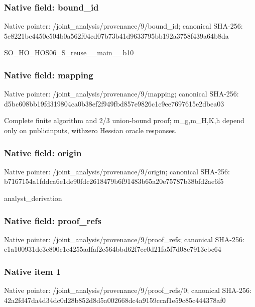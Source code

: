 \documentclass[10pt,a4paper]{article}
\begin{document}
\subsubsection{Native field: bound\_\allowbreak{}id}
Native pointer: /joint\_\allowbreak{}analysis/provenance/9/bound\_\allowbreak{}id; canonical SHA-256: 5e8221be4450e504b0a562f04cd07b73b41d9633795bb192a3758f439a64b8da

\begingroup\raggedright\sloppy SO\_\allowbreak{}HO\_\allowbreak{}HOS06\_\allowbreak{}S\_\allowbreak{}reuse\_\allowbreak{}\_\allowbreak{}main\_\allowbreak{}\_\allowbreak{}b10\par\endgroup

\subsubsection{Native field: mapping}
Native pointer: /joint\_\allowbreak{}analysis/provenance/9/mapping; canonical SHA-256: d5bc608bb19fd319804ca0b38ef2f949fbd857e9826c1c9ee7697615e2dbea03

\begingroup\raggedright\sloppy Complete finite algorithm and 2/\allowbreak{}3 union-bound proof;\allowbreak{} m\_\allowbreak{}g,\allowbreak{}m\_\allowbreak{}H,\allowbreak{}K,\allowbreak{}h depend only on publicinputs,\allowbreak{} withzero Hessian oracle responses.\par\endgroup

\subsubsection{Native field: origin}
Native pointer: /joint\_\allowbreak{}analysis/provenance/9/origin; canonical SHA-256: b7167154a1fddca6e1de90fdc2618479b6f91483b65a20e75787b38bfd2ae6f5

\begingroup\raggedright\sloppy analyst\_\allowbreak{}derivation\par\endgroup

\subsubsection{Native field: proof\_\allowbreak{}refs}
Native pointer: /joint\_\allowbreak{}analysis/provenance/9/proof\_\allowbreak{}refs; canonical SHA-256: e1a100931de3c800c1e4255adfaf2e564bbd62f7cc0d21fa5f7d08c7913cbc64

\subsubsection{Native item 1}
Native pointer: /joint\_\allowbreak{}analysis/provenance/9/proof\_\allowbreak{}refs/0; canonical SHA-256: 42a2fd47da4d34dc0d28b852d8d5a002668dc4a9159ccaf1e59c85c444378af0
\end{document}
